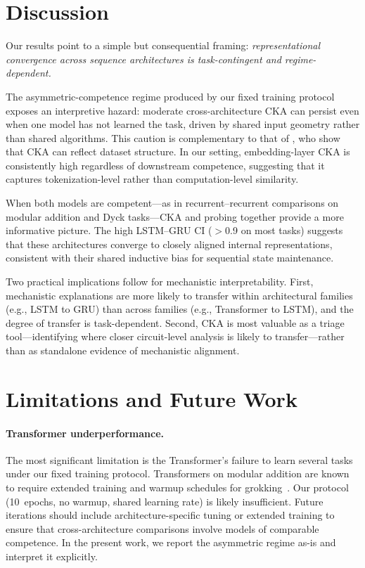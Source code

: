 \documentclass{article}
\begin{document}
\section{Discussion}
\label{sec:discussion}

Our results point to a simple but consequential framing: 
\emph{representational convergence across sequence architectures 
is task-contingent and regime-dependent.}

The asymmetric-competence regime produced by our fixed training 
protocol exposes an interpretive hazard: moderate 
cross-architecture CKA can persist even when one model has not 
learned the task, driven by shared input geometry rather than 
shared algorithms. This caution is complementary to that of 
\citet{cui2022deconfounded}, who show that CKA can reflect 
dataset structure. In our setting, embedding-layer CKA is 
consistently high regardless of downstream competence, 
suggesting that it captures tokenization-level rather than 
computation-level similarity.

When both models are competent---as in recurrent--recurrent 
comparisons on modular addition and Dyck tasks---CKA and probing 
together provide a more informative picture. The high LSTM--GRU 
CI ($>$0.9 on most tasks) suggests that these architectures 
converge to closely aligned internal representations, consistent 
with their shared inductive bias for sequential state 
maintenance.

Two practical implications follow for mechanistic 
interpretability. First, mechanistic explanations are more likely 
to transfer within architectural families (e.g., LSTM to GRU) 
than across families (e.g., Transformer to LSTM), and the 
degree of transfer is task-dependent. Second, CKA is most 
valuable as a triage tool---identifying where closer 
circuit-level analysis is likely to transfer---rather than as 
standalone evidence of mechanistic alignment.

\section{Limitations and Future Work}
\label{sec:limitations}

\paragraph{Transformer underperformance.}
The most significant limitation is the Transformer's failure to 
learn several tasks under our fixed training protocol. 
Transformers on modular addition are known to require extended 
training and warmup schedules for 
grokking~\citep{nanda2023grokking}. Our protocol (10~epochs, no 
warmup, shared learning rate) is likely insufficient. Future 
iterations should include architecture-specific tuning or 
extended training to ensure that cross-architecture comparisons 
involve models of comparable competence. In the present work, 
we report the asymmetric regime as-is and interpret it 
explicitly.
\end{document}
